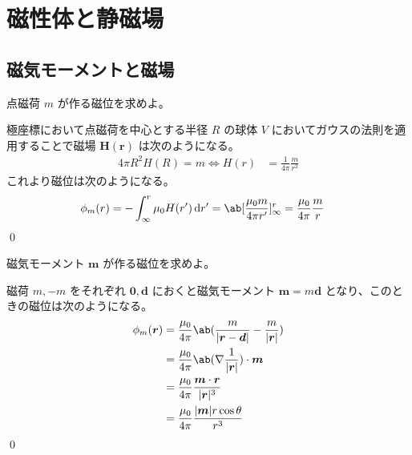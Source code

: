 \documentclass[uplatex,dvipdfmx,a4paper,11pt]{jlreq}
\makeatletter
\newcommand{\HH}{\bm{H}}
\newcommand{\rr}{\bm{r}}
\newcommand{\mm}{\bm{m}}
\newcommand{\vnabla}{\mathbf{\nabla}}
\theoremstyle{definition}
\renewenvironment{proof}[1][\proofname]{\par
  \normalfont
  \topsep6\p@\@plus6\p@ \trivlist
  \item[\hskip\labelsep{\bfseries #1}\@addpunct{\bfseries}]\ignorespaces\quad\par
}{%
  \qed\endtrivlist\@endpefalse
}
\renewcommand\proofname{証明}
\makeatother
\begin{document}
\section{磁性体と静磁場}
\setcounter{subsection}{4}
\subsection{磁気モーメントと磁場}
\begin{problem}
点磁荷 $m$ が作る磁位を求めよ。
\end{problem}
\begin{proof}
  極座標において点磁荷を中心とする半径 $R$ の球体 $V$ においてガウスの法則を適用することで磁場 $\HH(\rr)$ は次のようになる。
  \begin{align}
    4\pi R^2H(R) = m \iff H(r) & = \frac{1}{4\pi}\frac{m}{r^2}
  \end{align}
  これより磁位は次のようになる。
  \begin{align}
    \phi_m(r) & = -\int_{\infty}^{r}\mu_0H(r')\dl{r'} = \ab[\frac{\mu_0m}{4\pi r'}]_{\infty}^{r} = \frac{\mu_0}{4\pi}\frac{m}{r}
  \end{align}
\end{proof}

\begin{problem}
磁気モーメント $\bm{m}$ が作る磁位を求めよ。
\end{problem}
\begin{proof}
  磁荷 $m, -m$ をそれぞれ $\bm{0}, \bm{d}$ におくと磁気モーメント $\mm = m\bm{d}$ となり、このときの磁位は次のようになる。
  \begin{align}
    \phi_m(\rr) & = \frac{\mu_0}{4\pi}\ab(\frac{m}{|\rr - \bm{d}|} - \frac{m}{|\rr|}) \\
                & = \frac{\mu_0}{4\pi}\ab(\vnabla\frac{1}{|\rr|})\cdot\mm             \\
                & = \frac{\mu_0}{4\pi}\frac{\mm\cdot\rr}{|\rr|^3}                     \\
                & = \frac{\mu_0}{4\pi}\frac{|\mm|r\cos\theta}{r^3}
  \end{align}
\end{proof}
\end{document}

